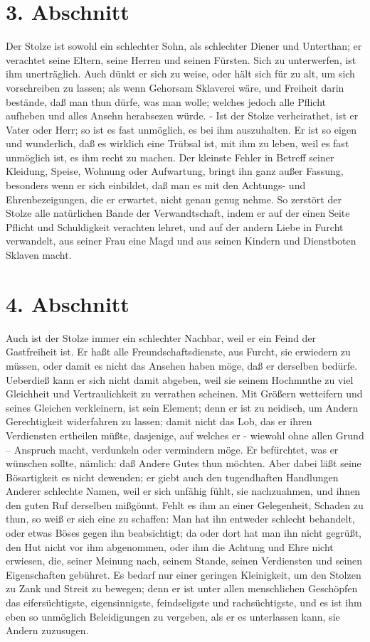\section{3. Abschnitt}

Der Stolze ist sowohl ein schlechter Sohn, als schlechter Diener und Unterthan; er verachtet seine Eltern, seine Herren und seinen Fürsten. Sich zu unterwerfen, ist ihm unerträglich. Auch dünkt er sich zu weise, oder hält sich für zu alt, um sich vorschreiben zu lassen; als wenn Gehorsam Sklaverei wäre, und Freiheit darin bestände, daß man thun dürfe, was man wolle; welches jedoch alle Pflicht aufheben und alles Ansehn herabsezen würde. - Ist der Stolze verheirathet, ist er Vater oder Herr; so ist es fast unmöglich, es bei ihm auszuhalten. Er ist so eigen und wunderlich, daß es wirklich eine Trübsal ist, mit ihm zu leben, weil es fast unmöglich ist, es ihm recht zu machen. Der kleinste Fehler in Betreff seiner Kleidung, Speise, Wohnung oder Aufwartung, bringt ihn ganz außer Fassung, besonders wenn er sich einbildet, daß man es mit den Achtungs- und Ehrenbezeigungen, die er erwartet, nicht genau genug nehme. So zerstört der Stolze alle natürlichen Bande der Verwandtschaft, indem er auf der einen Seite Pflicht und Schuldigkeit verachten lehret, und auf der andern Liebe in Furcht verwandelt, aus seiner Frau eine Magd und aus seinen Kindern und Dienstboten Sklaven macht.

\section{4. Abschnitt}

Auch ist der Stolze immer ein schlechter Nachbar, weil er ein Feind der Gastfreiheit ist. Er haßt alle Freundschaftsdienste, aus Furcht, sie erwiedern zu müssen, oder damit es nicht das Ansehen haben möge, daß er derselben bedürfe. Ueberdieß kann er sich nicht damit abgeben, weil sie seinem Hochmnthe zu viel Gleichheit und Vertraulichkeit zu verrathen scheinen. Mit Größern wetteifern und seines Gleichen verkleinern, ist sein Element; denn er ist zu neidisch, um Andern Gerechtigkeit widerfahren zu lassen; damit nicht das Lob, das er ihren Verdiensten ertheilen müßte, dasjenige, auf welches er - wiewohl ohne allen Grund -- Anspruch macht, verdunkeln oder vermindern möge. Er befürchtet, was er wünschen sollte, nämlich: daß Andere Gutes thun möchten. Aber dabei läßt seine Bösartigkeit es nicht dewenden; er giebt auch den tugendhaften Handlungen Anderer schlechte Namen, weil er sich unfähig fühlt, sie nachzuahmen, und ihnen den guten Ruf derselben mißgönnt. Fehlt es ihm an einer Gelegenheit, Schaden zu thun, so weiß er sich eine zu schaffen: Man hat ihn entweder schlecht behandelt, oder etwas Böses gegen ihn beabsichtigt; da oder dort hat man ihn nicht gegrüßt, den Hut nicht vor ihm abgenommen, oder ihm die Achtung und Ehre nicht erwiesen, die, seiner Meinung nach, seinem Stande, seinen Verdiensten und seinen Eigenschaften gebühret. Es bedarf nur einer geringen Kleinigkeit, um den Stolzen zu Zank und Streit zu bewegen; denn er ist unter allen menschlichen Geschöpfen das eifersüchtigste, eigensinnigste, feindseligste und rachsüchtigste, und es ist ihm eben so unmöglich Beleidigungen zu vergeben, als er es unterlassen kann, sie Andern zuzusugen.

